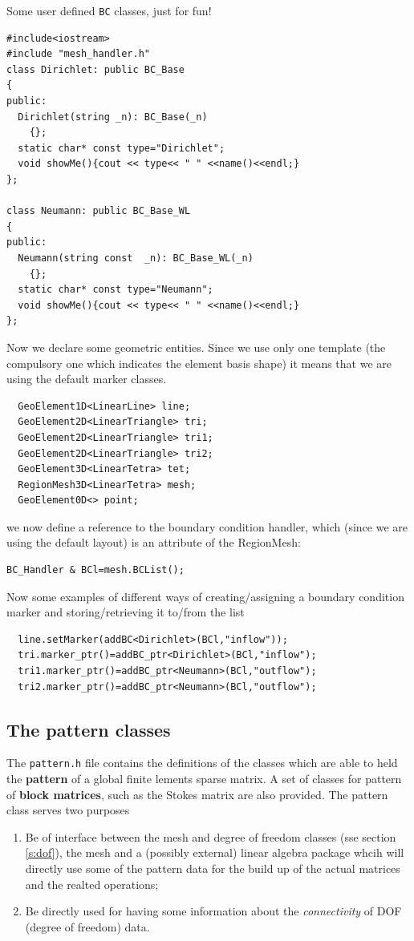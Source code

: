 Some user defined \texttt{BC} classes, just for fun!
\begin{verbatim}
#include<iostream>
#include "mesh_handler.h"
class Dirichlet: public BC_Base
{
public:
  Dirichlet(string _n): BC_Base(_n)
    {};
  static char* const type="Dirichlet";
  void showMe(){cout << type<< " " <<name()<<endl;}
};

class Neumann: public BC_Base_WL
{
public:
  Neumann(string const  _n): BC_Base_WL(_n)
    {};
  static char* const type="Neumann";
  void showMe(){cout << type<< " " <<name()<<endl;}
};
\end{verbatim}
Now we declare some geometric entities. Since we use only one
template (the compulsory one which indicates the element basis shape) it
means that we are using the default marker classes.
\begin{verbatim}
  GeoElement1D<LinearLine> line;
  GeoElement2D<LinearTriangle> tri;
  GeoElement2D<LinearTriangle> tri1;
  GeoElement2D<LinearTriangle> tri2;
  GeoElement3D<LinearTetra> tet;
  RegionMesh3D<LinearTetra> mesh;
  GeoElement0D<> point;
\end{verbatim}

we now define a reference to the boundary condition handler,
which (since we are using the default layout) is an attribute of the
RegionMesh:
\begin{verbatim}
BC_Handler & BCl=mesh.BCList();
\end{verbatim}

Now some examples of different ways of creating/assigning a boundary condition
marker and storing/retrieving  it to/from  the list
\begin{verbatim}
  line.setMarker(addBC<Dirichlet>(BCl,"inflow"));
  tri.marker_ptr()=addBC_ptr<Dirichlet>(BCl,"inflow");
  tri1.marker_ptr()=addBC_ptr<Neumann>(BCl,"outflow");
  tri2.marker_ptr()=addBC_ptr<Neumann>(BCl,"outflow");
\end{verbatim}
\subsection{The pattern classes}
\label{s:pattern}
The \texttt{pattern.h} file contains the definitions of the classes
which are able to held the \textbf{pattern} of a global finite lements
sparse matrix. A set of classes for pattern of \textbf{block matrices},
such as the Stokes matrix are also provided. The pattern class serves
two purposes
\begin{enumerate}
\item Be of interface between the mesh and degree of freedom classes
  (sse section \ref{s:dof}), the mesh and a (possibly external) linear
  algebra package whcih will directly use some of the  pattern data for
  the build up of the actual matrices and the realted operations;
\item Be directly used for having some information about the
  \textit{connectivity} of DOF (degree of freedom) data.
\end{enumerate}

